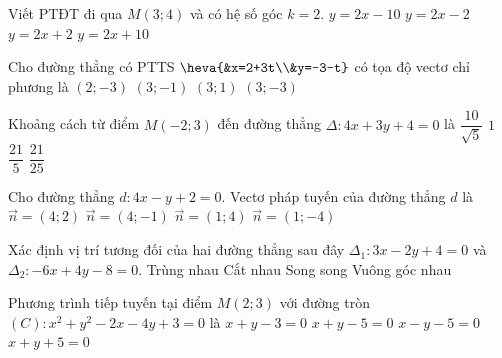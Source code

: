 	\begin{ex}%
		Viết PTĐT đi qua $M\left( 3;4 \right)$ và có hệ số góc $k=2$. 
		\choice
		{$y=2x-10$}
		{\True $y=2x-2$}
		{$y=2x+2$}
		{$y=2x+10$}
	\end{ex}
	
	

\begin{ex}%
	Cho đường thẳng có PTTS $\heva{&x=2+3t\\&y=-3-t}$ có tọa độ vectơ chỉ phương là
	\choice
	{$\left(2;-3\right)$}
	{\True $\left(3;-1\right)$}
	{$\left(3;1\right)$}
	{$\left(3;-3\right)$}
\end{ex}
\begin{ex}%
	Khoảng cách từ điểm $M(-2;3)$ đến đường thẳng $\Delta \colon 4x+3y+4=0$ là
	\choice
	{$\dfrac{10}{\sqrt{5}}$}
	{\True $1$}
	{$\dfrac{21}{5}$}
	{$\dfrac{21}{25}$}
\end{ex}
\begin{ex}%
	Cho đường thẳng $d \colon 4x-y+2=0$. Vectơ pháp tuyến của đường thẳng $d$ là
	\choice
	{$\overrightarrow{n}=(4;2)$}
	{\True $\overrightarrow{n}=(4;-1)$}
	{$\overrightarrow{n}=(1;4)$}
	{$\overrightarrow{n}=(1;-4)$}
\end{ex}
\begin{ex}%
	Xác định vị trí tương đối của hai đường thẳng sau đây $\Delta_1 \colon 3x-2y+4=0$ và \break $\Delta_2 \colon -6x+4y-8=0$.
	\choice
	{\True Trùng nhau}
	{Cắt nhau}
	{Song song}
	{Vuông góc nhau}
\end{ex}
\begin{ex}%
	Phương trình tiếp tuyến tại điểm $M(2;3)$ với đường tròn $(C) \colon x^2+y^2-2x-4y+3=0$ là
	\choice
	{$x+y-3=0$}
	{\True $x+y-5=0$}
	{$x-y-5=0$}
	{$x+y+5=0$}
\end{ex}

